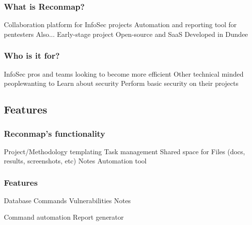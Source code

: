 \begin{frame}
    \frametitle{What is Reconmap?}

    \note[item]{
    }
    
    \begin{outline}
	\1 Collaboration platform for InfoSec projects    
	\1 Automation and reporting tool for pentesters
	\1 Also...
    \2 Early-stage project
	\2 Open-source and SaaS
    \2 Developed in Dundee\footnotemark[1]
    \end{outline}
    
\end{frame}

\begin{frame}
    \frametitle{Who is it for?}

    \note[item]{
    }
    
    \begin{outline}
	\1 InfoSec pros and teams looking to become more efficient
	\1 Other technical minded people\footnotemark[1] wanting to
	\2 Learn about security
    \2 Perform basic security on their projects
    \end{outline}
    
\end{frame}

\subsection{Features}

\begin{frame}
    \frametitle{Reconmap's functionality}

    \note[item]{
    }
    
    \begin{outline}
	\1 Project/Methodology templating
	\1 Task management
	\1 Shared space for
		\2 Files (docs, results, screenshots, etc)
		\2 Notes
	\1 Automation tool
    \end{outline}
\end{frame}


\begin{frame}
    \frametitle{Features}

    \note[item]{
    }
    
    \begin{outline}  		
    		\1 Database
    			\2 Commands
    			\2 Vulnerabilities
    			\2 Notes
    			
    		\1 Command automation
    		\1 Report generator
    \end{outline}
\end{frame}

